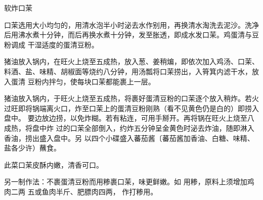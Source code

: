 \begin{recipe}{软炸口茉}

\ingredients


\cooking

\step 口茉选用大小均匀的，用清水泡半小时泌去水作别用，再换清水淘洗去泥沙。洗净
后用沸水煮十分钟，而后再换水煮十分钟，发至胀透，即成水发口茉。鸡蛋清与豆粉调成
干湿适度的蛋清豆粉。

\step 猪油放入锅内，在旺火上烧至五成热，放入葱、姜稍煸，即依次加入鸡汤、口茉、
料酒、盐、味精、胡椒面等烧约八分钟，用汤瓢将口茉捞出，入筲箕内滤干水，放入蛋清
豆粉内拌匀，使每块口茉都能裹上一层。

\step 猪油放入锅内，于旺火上烧至五成热，将裹好蛋清豆粉的口茉逐个放入稍炸。若火
过旺即将锅端离火口，炸至口茉上的蛋清豆粉刚熟（看不见黄色仍是白的）即捞入盘中。
要边放边捞，以免炸糊。若有粘连，可用手掰开。再将锅在旺火上烧至八成热，将盘中炸
过的口茉全部倒入，约炸五分钟呈金黄色时泌去炸油，随即淋入香油，捞出盛入盘中。另
以四个小碟盛入蕃茄酱〔蕃茄酱加香油、白糖、味精、盐各少许）蘸食。

\features

此菜口茉皮酥内嫩，清香可口。

另一制作法：不裹蛋清豆粉而用糁裹口茉，味更鲜嫩。如 用糁，原料上须增加鸡肉二两
五或鱼肉半斤、肥膘肉四两， 作打糁用。

\end{recipe}

